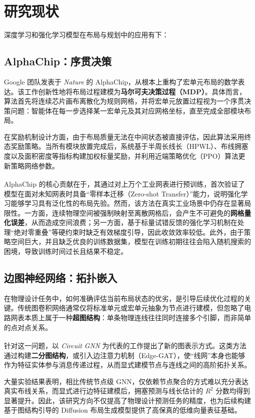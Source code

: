 \documentclass[12pt, a4paper]{article}
\begin{document}
\section{研究现状} 
深度学习和强化学习模型在布局与规划中的应用有下：
\subsection{AlphaChip：序贯决策}

Google 团队发表于 \emph{Nature} 的 AlphaChip，从根本上重构了宏单元布局的数学表达。该工作创新性地将布局过程建模为\textbf{马尔可夫决策过程（MDP）}。具体而言，算法首先将连续芯片画布离散化为规则网格，并将宏单元放置过程视为一个序贯决策问题：智能体在每一步选择某一宏单元及其对应网格坐标，直至完成全部模块布局。

在奖励机制设计方面，由于布局质量无法在中间状态被直接评估，因此算法采用终态奖励策略。当所有模块放置完成后，系统基于半周长线长（HPWL）、布线拥塞度以及面积密度等指标构建加权标量奖励，并利用近端策略优化（PPO）算法更新策略网络参数。

AlphaChip\textsuperscript{\cite{mirhoseiniGraphPlacementMethodology2021}} 的核心贡献在于，其通过对上万个工业网表进行预训练，首次验证了模型在面对未知网表时具备“零样本迁移（Zero-shot Transfer）”能力，说明强化学习能够学习具有泛化性的布局先验。然而，该方法在真实工业场景中仍存在显著局限性。一方面，连续物理空间被强制映射至离散网格后，会产生不可避免的\textbf{网格量化误差}，从而造成空间浪费；另一方面，基于标量试错反馈的强化学习机制在处理“绝对零重叠”等硬约束时缺乏有效梯度引导，因此收敛效率较低。此外，由于策略空间巨大，并且缺乏优良的训练数据集，模型在训练初期往往会陷入随机搜索的困境，导致训练时间过长且结果不稳定。

\subsection{边图神经网络：拓扑嵌入}

在物理设计任务中，如何准确评估当前布局状态的优劣，是引导后续优化过程的关键。传统图卷积网络通常仅将标准单元或宏单元抽象为节点进行建模，但忽略了电路网表本质上属于一种\textbf{超图结构}：单条物理连线往往同时连接多个引脚，而非简单的点对点关系。

针对这一问题，以 \emph{Circuit GNN}\textsuperscript{\cite{zhangCircuitGNNGraphNeural}} 为代表的工作提出了新的图表示方式。这类方法通过构建\textbf{二分图结构}，或引入边注意力机制（Edge-GAT），使“线网”本身也能够作为特征实体参与消息传递过程，从而显式建模节点与连线之间的高阶拓扑关系。

大量实验结果表明，相比传统节点级 GNN，仅依赖节点聚合的方式难以充分表达真实布线关系，而显式进行边特征建模后，拥塞预测与线长估计的 $R^2$ 分数均得到显著提升。因此，该研究方向不仅提高了物理设计预测任务的精度，也为后续构建基于图结构引导的 Diffusion 布局生成模型提供了高保真的低维向量表征基础。
\end{document}

